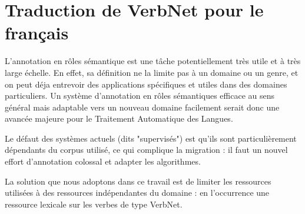 \chapter{Traduction de VerbNet pour le français}
\label{ch:verbnet}

L'annotation en rôles sémantique est une tâche potentiellement très utile et à très large échelle. En effet, sa définition ne la limite pas à un domaine ou un genre, et on peut déja entrevoir des applications spécifiques et utiles dans des domaines particuliers. Un système d'annotation en rôles sémantiques efficace au sens général mais adaptable vers un nouveau domaine facilement serait donc une avancée majeure pour le Traitement Automatique des Langues.

Le défaut des systèmes actuels (dits "supervisés") est qu'ils sont particulièrement dépendants du corpus utilisé, ce qui complique la migration : il faut un nouvel effort d'annotation colossal et adapter les algorithmes.

La solution que nous adoptons dans ce travail est de limiter les ressources utilisées à des ressources indépendantes du domaine : en l'occurrence une ressource lexicale sur les verbes de type VerbNet.

